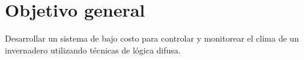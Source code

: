 \section{Objetivo general}

Desarrollar un sistema de bajo costo para controlar y monitorear el clima de un invernadero utilizando técnicas de lógica difusa.